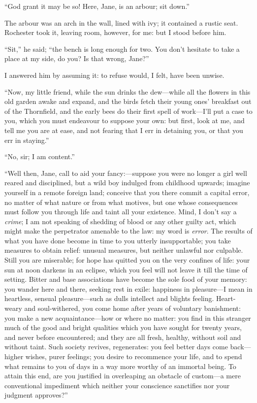 \enquote{God grant it may be so! Here, Jane, is an arbour; sit down.}

The arbour was an arch in the wall, lined with ivy; it contained a
rustic seat. \Mr{} Rochester took it, leaving room, however, for me: but
I stood before him.

\enquote{Sit,} he said; \enquote{the bench is long enough for two. You
don't hesitate to take a place at my side, do you? Is that wrong,
Jane?}

I answered him by assuming it: to refuse would, I felt, have been
unwise.

\enquote{Now, my little friend, while the sun drinks the dew---while all
the flowers in this old garden awake and expand, and the birds fetch
their young ones' breakfast out of the Thornfield, and the early bees do
their first spell of work---I'll put a case to you, which you must
endeavour to suppose your own: but first, look at me, and tell me you
are at ease, and not fearing that I err in detaining you, or that you
err in staying.}

\enquote{No, sir; I am content.}

\enquote{Well then, Jane, call to aid your fancy:---suppose you were no longer
a girl well reared and disciplined, but a wild boy indulged from
childhood upwards; imagine yourself in a remote foreign land; conceive
that you there commit a capital error, no matter of what nature or from
what motives, but one whose consequences must follow you through life
and taint all your existence. Mind, I don't say a \emph{crime}; I am
not speaking of shedding of blood or any other guilty act, which might
make the perpetrator amenable to the law: my word is \emph{error}. The
results of what you have done become in time to you utterly
insupportable; you take measures to obtain relief: unusual measures, but
neither unlawful nor culpable. Still you are miserable; for hope has
quitted you on the very confines of life: your sun at noon darkens in an
eclipse, which you feel will not leave it till the time of setting. 
Bitter and base associations have become the sole food of your memory:
you wander here and there, seeking rest in exile: happiness in
pleasure---I mean in heartless, sensual pleasure---such as dulls
intellect and blights feeling. Heart-weary and soul-withered, you come
home after years of voluntary banishment: you make a new
acquaintance---how or where no matter: you find in this stranger much of
the good and bright qualities which you have sought for twenty years,
and never before encountered; and they are all fresh, healthy, without
soil and without taint. Such society revives, regenerates: you feel
better days come back---higher wishes, purer feelings; you desire to
recommence your life, and to spend what remains to you of days in a way
more worthy of an immortal being. To attain this end, are you justified
in overleaping an obstacle of custom---a mere conventional impediment
which neither your conscience sanctifies nor your judgment approves?}


